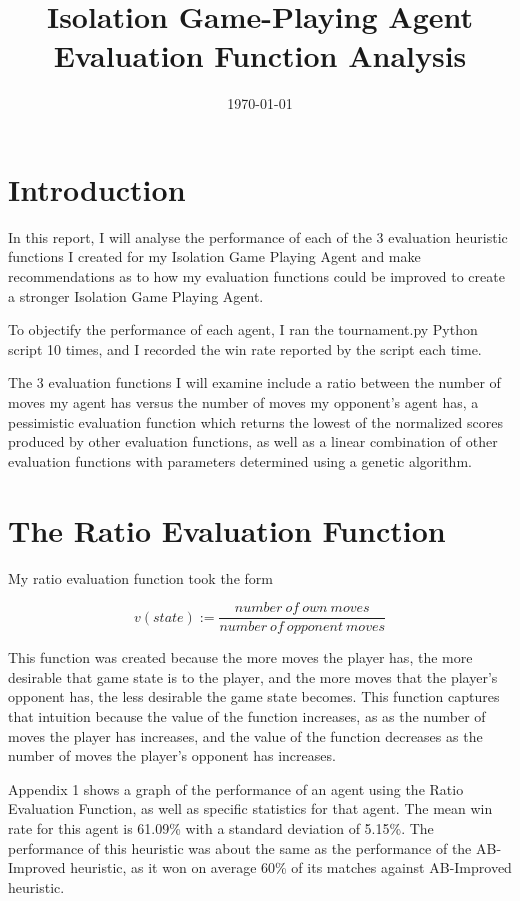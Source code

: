 \documentclass[12pt]{article}
\title{Isolation Game-Playing Agent Evaluation Function Analysis}
\date{\today}
\begin{document}
\maketitle

\section{Introduction}
In this report, I will analyse the performance of each of the 3 evaluation heuristic functions I created for my Isolation Game Playing Agent and make recommendations as to how my evaluation functions could be improved to create a stronger Isolation Game Playing Agent. 

To objectify the performance of each agent, I ran the tournament.py Python script 10 times, and I recorded the win rate reported by the script each time.

The 3 evaluation functions I will examine include a ratio between the number of moves my agent has versus the number of moves my opponent's agent has, a pessimistic evaluation function which returns the lowest of the normalized scores produced by other evaluation functions, as well as a linear combination of other evaluation functions with parameters determined using a genetic algorithm.

\section{The Ratio Evaluation Function}
My ratio evaluation function took the form

\begin{equation*}
v(state):=\dfrac{number\ of\ own\ moves}{number\ of\ opponent\ moves}
\end{equation*}

This function was created because the more moves the player has, the more desirable that game state is to the player, and the more moves that the player's opponent has, the less desirable the game state becomes. This function captures that intuition because the value of the function increases, as as the number of moves the player has increases, and the value of the function decreases as the number of moves the player's opponent has increases.

Appendix 1 shows a graph of the performance of an agent using the Ratio Evaluation Function, as well as specific statistics for that agent. The mean win rate for this agent is 61.09\% with a standard deviation of 5.15\%. The performance of this heuristic was about the same as the performance of the AB-Improved heuristic, as it won on average 60\% of its matches against AB-Improved heuristic.
\end{document}
